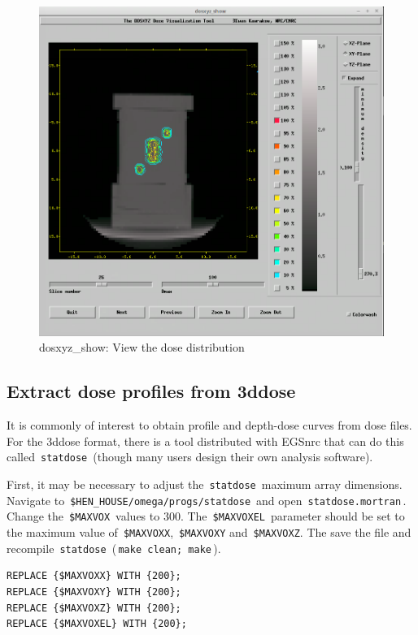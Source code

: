 \documentclass[12pt,twoside]{article}
\begin{document}
\begin{figure}
\begin{center}
\includegraphics[width=5in]{figures/dosxyz_show}
\caption{dosxyz\_show: View the dose distribution}
\label{fig:dosxyz_show}
\end{center}
\end{figure}

\clearpage
\subsection{Extract dose profiles from 3ddose}
It is commonly of interest to obtain profile and depth-dose curves from dose files. For the 3ddose format, there is a tool distributed with EGSnrc that can do this called \,\Verb|statdose|\, (though many users design their own analysis software).

First, it may be necessary to adjust the \,\Verb|statdose|\, maximum array dimensions. Navigate to \,\Verb|$HEN_HOUSE/omega/progs/statdose|\, and open \,\Verb|statdose.mortran|\,. Change the \,\Verb|$MAXVOX|\, values to 300. The \,\Verb|$MAXVOXEL|\, parameter should be set to the maximum value of \,\Verb|$MAXVOXX|, \,\Verb|$MAXVOXY| and \,\Verb|$MAXVOXZ|. The save the file and recompile \,\Verb|statdose|\, (\,\Verb|make clean; make|\,).

{\scriptsize
\begin{lstlisting}[language={},backgroundcolor=\color{white}]
REPLACE {$MAXVOXX} WITH {200};
REPLACE {$MAXVOXY} WITH {200};
REPLACE {$MAXVOXZ} WITH {200};
REPLACE {$MAXVOXEL} WITH {200};
\end{lstlisting}
}
\end{document}
